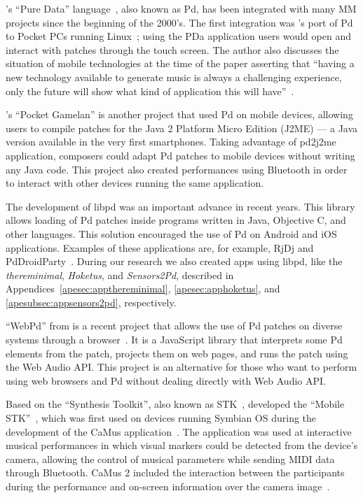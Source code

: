 's ``Pure Data'' language~\citep{Puckette1997puredata}, also known as Pd, has been integrated with many MM projects since the beginning of the 2000's.
The first integration was 's port of Pd to Pocket PCs running Linux~\citep{Geiger2003pda};
using the PDa application users would open and interact with patches through the touch screen.
The author also discusses the situation of mobile technologies at the time of the paper asserting that	``having a new technology available to generate music is always a challenging experience, only the future will show what kind of application this will have''~\cite[p.~4]{Geiger2003pda}. 

\citeauthor{Schiemer2005pocketgamelan}'s ``Pocket Gamelan'' is another project that used Pd on mobile devices, allowing users to compile patches for the Java 2 Platform Micro Edition (J2ME) --- a Java version available in the very first smartphones.
Taking advantage of pd2j2me application, composers could adapt Pd patches to mobile devices without writing any Java code.
This project also created performances using Bluetooth in order to interact with other devices running the same application.

The development of libpd was an important advance in recent years.
This library allows loading of Pd patches inside programs written in Java, Objective C, and other languages.
This solution encouraged the use of Pd on Android and iOS applications.
Examples of these applications are, for example, RjDj and PdDroidParty~\citep{Brinkmann2011embeddingpd,Brinkmann2012makingmusicalapps}.
During our research we also created apps using libpd, like the \textit{thereminimal}, \textit{Hoketus}, and \textit{Sensors2Pd}, described in Appendices~\ref{apesec:appthereminimal}, \ref{apesec:apphoketus}, and \ref{apesubsec:appsensors2pd}, respectively.

``WebPd'' from \citeauthor{Piquemal2017webpd} is a recent project that allows the use of Pd patches on diverse systems through a browser~\citep{Piquemal2017webpd}.
It is a JavaScript library that interprets some Pd elements from the patch, projects them on web pages, and runs the patch using the Web Audio API.
This project is an alternative for those who want to perform using web browsers and Pd without dealing directly with Web Audio API.

Based on the ``Synthesis Toolkit'', also known as STK~\citep{Cook1999stk}, \citeauthor{Essl2006mobilestk} developed the ``Mobile STK''~\citep{Essl2006mobilestk}, which was first used on devices running  Symbian OS during the development of the CaMus application~\citep{Rohs2006camus}.
The application was used at interactive musical performances in which visual markers could be detected from the device's camera, allowing the control of musical parameters while sending MIDI data through Bluetooth.
CaMus 2 included the interaction between the participants during the performance and on-screen information over the camera image~\citep{Rohs2007camus2}.

